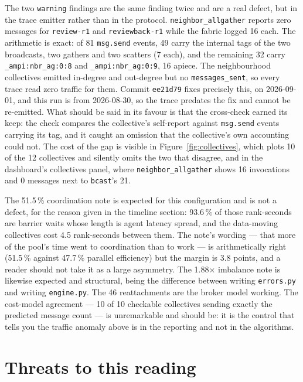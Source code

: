 \documentclass[11pt]{article}
\begin{document}
The two \texttt{warning} findings are the same finding twice and are a real defect, but in the
trace emitter rather than in the protocol. \texttt{neighbor\_allgather} reports zero messages for
\texttt{review-r1} and \texttt{reviewback-r1} while the fabric logged 16 each. The arithmetic is
exact: of 81 \texttt{msg.send} events, 49 carry the internal tags of the two broadcasts, two
gathers and two scatters (7 each), and the remaining 32 carry \texttt{\_ampi:nbr\_ag:0:8} and
\texttt{\_ampi:nbr\_ag:0:9}, 16 apiece. The neighbourhood collectives emitted in-degree and
out-degree but no \texttt{messages\_sent}, so every trace read zero traffic for them. Commit
\texttt{ee21d79} fixes precisely this, on 2026-09-01, and this run is from 2026-08-30, so the
trace predates the fix and cannot be re-emitted. What should be said in its favour is that the
cross-check earned its keep: the check compares the collective's self-report against
\texttt{msg.send} events carrying its tag, and it caught an omission that the collective's own
accounting could not. The cost of the gap is visible in Figure~\ref{fig:collectives}, which plots
10 of the 12 collectives and silently omits the two that disagree, and in the dashboard's
collectives panel, where \texttt{neighbor\_allgather} shows 16 invocations and 0 messages next to
\texttt{bcast}'s 21.

The 51.5\,\% coordination note is expected for this configuration and is not a defect, for the
reason given in the timeline section: 93.6\,\% of those rank-seconds are barrier waits whose
length is agent latency spread, and the data-moving collectives cost 4.5 rank-seconds between
them. The note's wording --- that more of the pool's time went to coordination than to work --- is
arithmetically right (51.5\,\% against 47.7\,\% parallel efficiency) but the margin is 3.8 points,
and a reader should not take it as a large asymmetry. The 1.88$\times$ imbalance note is likewise
expected and structural, being the difference between writing \texttt{errors.py} and writing
\texttt{engine.py}. The 46 reattachments are the broker model working. The cost-model agreement
--- 10 of 10 checkable collectives sending exactly the predicted message count --- is unremarkable
and should be: it is the control that tells you the traffic anomaly above is in the reporting and
not in the algorithms.

\section{Threats to this reading}
\end{document}
